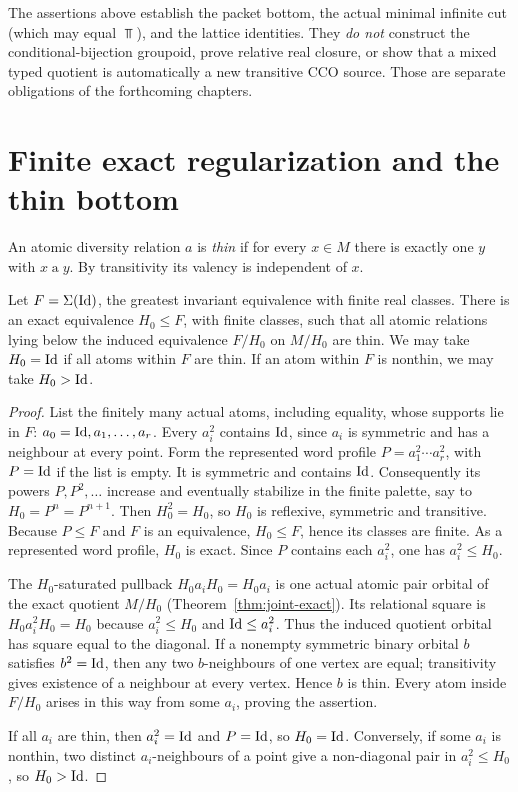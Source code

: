 \begin{remark}[Scope]\label{rem:packet-scope}
The assertions above establish the packet bottom, the actual minimal infinite cut (which may equal $\Top$), and the lattice identities.  They \emph{do not} construct the
conditional-bijection groupoid, prove relative real closure, or show
that a mixed typed quotient is automatically a new transitive CCO
source.  Those are separate obligations of the forthcoming chapters.
\end{remark}

\section{Finite exact regularization and the thin bottom}
\label{sec:finite-regularization}
An atomic diversity relation $a$ is \emph{thin} if for every
$x\in M$ there is exactly one $y$ with $x\mathrel a y$.
By transitivity its valency is independent of $x$.

\begin{lemma}\label{lem:finite-regularization}
Let $F=\Sigma(\mathrm{Id})$, the greatest invariant equivalence with
finite real classes.  There is an exact equivalence $H_0\le F$,
with finite classes, such that all atomic relations lying below
the induced equivalence $F/H_0$ on $M/H_0$ are thin.
We may take $H_0=\mathrm{Id}$ if all atoms within $F$ are thin.
If an atom within $F$ is nonthin, we may take $H_0>\mathrm{Id}$.
\end{lemma}
\begin{proof}
List the finitely many actual atoms, including equality, whose
supports lie in $F$: $a_0=\mathrm{Id},a_1,\ldots,a_r$.
Every $a_i^2$ contains $\mathrm{Id}$, since $a_i$ is symmetric and has
a neighbour at every point.  Form the represented word profile
$P=a_1^2\cdots a_r^2$, with $P=\mathrm{Id}$ if the list is empty.
It is symmetric and contains $\mathrm{Id}$.  Consequently its powers
$P,P^2,\ldots$ increase and eventually stabilize in the finite
palette, say to $H_0=P^n=P^{n+1}$.
Then $H_0^2=H_0$, so $H_0$ is reflexive, symmetric and transitive.
Because $P\le F$ and $F$ is an equivalence, $H_0\le F$, hence its
classes are finite.  As a represented word profile, $H_0$ is exact.
Since $P$ contains each $a_i^2$, one has $a_i^2\le H_0$.

The $H_0$-saturated pullback $H_0a_iH_0=H_0a_i$ is one
actual atomic pair orbital of the exact quotient $M/H_0$
(Theorem~\ref{thm:joint-exact}).  Its relational square is
$H_0a_i^2H_0=H_0$ because $a_i^2\le H_0$ and $\mathrm{Id}\le a_i^2$.
Thus the induced quotient orbital has square equal to the diagonal.
If a nonempty symmetric binary orbital $b$ satisfies
$b^2=\mathrm{Id}$, then any two $b$-neighbours of one vertex are equal;
transitivity gives existence of a neighbour at every vertex.
Hence $b$ is thin.  Every atom inside $F/H_0$ arises in this
way from some $a_i$, proving the assertion.

If all $a_i$ are thin, then $a_i^2=\mathrm{Id}$ and $P=\mathrm{Id}$, so
$H_0=\mathrm{Id}$.  Conversely, if some $a_i$ is nonthin, two distinct
$a_i$-neighbours of a point give a non-diagonal pair in
$a_i^2\le H_0$, so $H_0>\mathrm{Id}$.
\end{proof}

